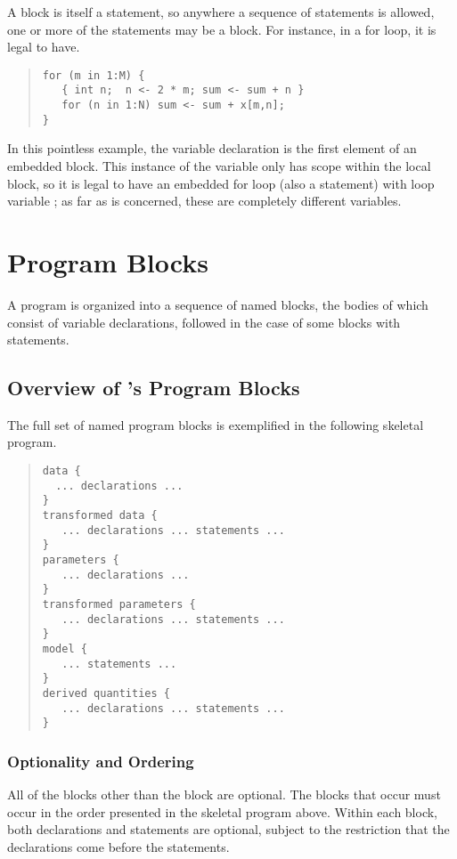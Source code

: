A block is itself a statement, so anywhere a sequence of statements is
allowed, one or more of the statements may be a block.  For instance,
in a for loop, it is legal to have.
%
\begin{quote}
\begin{Verbatim}
for (m in 1:M) {
   { int n;  n <- 2 * m; sum <- sum + n }
   for (n in 1:N) sum <- sum + x[m,n];
}
\end{Verbatim}
\end{quote}
%
In this pointless example, the variable declaration  is
the first element of an embedded block.  This instance of the variable
 only has scope within the local block, so it is legal to have
an embedded for loop (also a statement) with loop variable ;
as far as \Stan is concerned, these are completely different
variables.



\chapter{Program Blocks}\label{blocks.chapter}

A \Stan program is organized into a sequence of named blocks, the
bodies of which consist of variable declarations, followed in the case
of some blocks with statements.  

\section{Overview of \Stan's Program Blocks}

The full set of named program blocks is exemplified in the following
skeletal \Stan program.
%
\begin{quote}
\begin{Verbatim} 
data { 
  ... declarations ...
}
transformed data { 
   ... declarations ... statements ... 
}
parameters { 
   ... declarations ... 
}
transformed parameters { 
   ... declarations ... statements ...
}
model { 
   ... statements ...
}
derived quantities {
   ... declarations ... statements ...
}
\end{Verbatim}
\end{quote}
%

\subsection{Optionality and Ordering}

All of the blocks other than the  block are optional.  The
blocks that occur must occur in the order presented in the skeletal
program above.  Within each block, both declarations and statements
are optional, subject to the restriction that the declarations come
before the statements.

